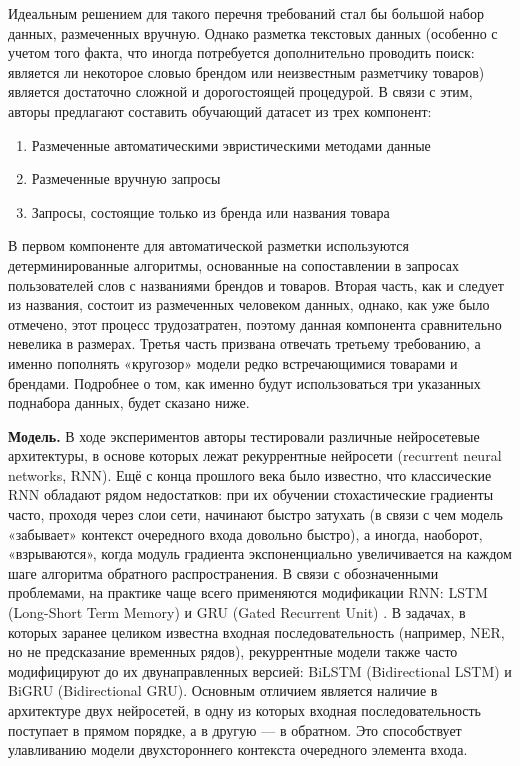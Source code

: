 \documentclass[12pt,a4paper]{article}
\begin{document}
\noindent Идеальным решением для такого перечня требований стал бы большой набор данных, размеченных вручную. Однако разметка текстовых данных (особенно с учетом того факта, что иногда потребуется дополнительно проводить поиск: является ли некоторое словыо брендом или неизвестным разметчику товаров) является достаточно сложной и дорогостоящей процедурой. В связи с этим, авторы предлагают составить обучающий датасет из трех компонент:

\begin{enumerate}
    \item Размеченные автоматическими эвристическими методами данные
    \item Размеченные вручную запросы
    \item Запросы, состоящие только из бренда или названия товара
\end{enumerate}

\noindent В первом компоненте для автоматической разметки используются детерминированные алгоритмы, основанные на сопоставлении в запросах пользователей слов с названиями брендов и товаров. Вторая часть, как и следует из названия, состоит из размеченных человеком данных, однако, как уже было отмечено, этот процесс трудозатратен, поэтому данная компонента сравнительно невелика в размерах. Третья часть призвана отвечать третьему требованию, а именно пополнять «кругозор» модели редко встречающимися товарами и брендами. Подробнее о том, как именно будут использоваться три указанных поднабора данных, будет сказано ниже.

\textbf{Модель.} В ходе экспериментов авторы тестировали различные нейросетевые архитектуры, в основе которых лежат рекуррентные нейросети (recurrent neural networks, RNN). Ещё с конца прошлого века было известно, что классические RNN обладают рядом недостатков: при их обучении стохастические градиенты часто, проходя через слои сети, начинают быстро затухать (в связи с чем модель «забывает» контекст очередного входа довольно быстро), а иногда, наоборот, «взрываются», когда модуль градиента экспоненциально увеличивается на каждом шаге алгоритма обратного распространения. В связи с обозначенными проблемами, на практике чаще всего применяются модификации RNN: LSTM (Long-Short Term Memory) \cite{lstm}  и GRU (Gated Recurrent Unit) \cite{gru}. В задачах, в которых заранее целиком известна входная последовательность (например, NER, но не предсказание временных рядов), рекуррентные модели также часто модифицируют до их двунаправленных версией: BiLSTM (Bidirectional LSTM) и BiGRU (Bidirectional GRU). Основным отличием является наличие в архитектуре двух нейросетей, в одну из которых входная последовательность поступает в прямом порядке, а в другую --- в обратном. Это способствует улавливанию модели двухстороннего контекста очередного элемента входа. 
\end{document}
